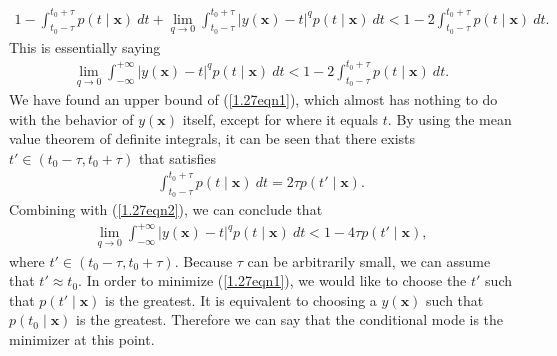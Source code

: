 \begin{answer}{}
\begin{gather}
		1 - \int_{t_0 - \tau}^{t_0 + \tau} p(t \mid \bm{x})\ dt + \lim_{q \rightarrow 0}\int_{t_0 - \tau}^{t_0 + \tau} \lvert y(\bm{x}) - t \rvert^q p(t \mid \bm{x})\ dt < 1 - 2\int_{t_0 - \tau}^{t_0 + \tau} p(t \mid \bm{x})\ dt.
	\end{gather}
	This is essentially saying
	\begin{align}
		\lim_{q \rightarrow 0} \int_{-\infty}^{+\infty} \lvert y(\bm{x}) - t \rvert^q p(t \mid \bm{x})\ dt < 1 - 2\int_{t_0 - \tau}^{t_0 + \tau} p(t \mid \bm{x})\ dt.\label{1.27eqn2}
	\end{align}
	We have found an upper bound of (\ref{1.27eqn1}), which almost has nothing to do with the behavior of $y(\bm{x})$ itself, except for where it equals $t$. By using the mean value theorem of definite integrals, it can be seen that there exists $t' \in (t_0 - \tau, t_0 + \tau)$ that satisfies
	\begin{align}
		\int_{t_0 - \tau}^{t_0 + \tau} p(t \mid \bm{x})\ dt = 2\tau p(t' \mid \bm{x}).
	\end{align}
	Combining with (\ref{1.27eqn2}), we can conclude that
	\begin{align}
		\lim_{q \rightarrow 0} \int_{-\infty}^{+\infty} \lvert y(\bm{x}) - t \rvert^q p(t \mid \bm{x})\ dt < 1 - 4\tau p(t' \mid \bm{x}),
	\end{align}
	where $t' \in (t_0 - \tau, t_0 + \tau)$. Because $\tau$ can be arbitrarily small, we can assume that $t' \approx t_0$. In order to minimize (\ref{1.27eqn1}), we would like to choose the $t'$ such that $p(t' \mid \bm{x})$ is the greatest. It is equivalent to choosing a $y(\bm{x})$ such that $p(t_0 \mid \bm{x})$ is the greatest. Therefore we can say that the conditional mode is the minimizer at this point.
\end{answer}